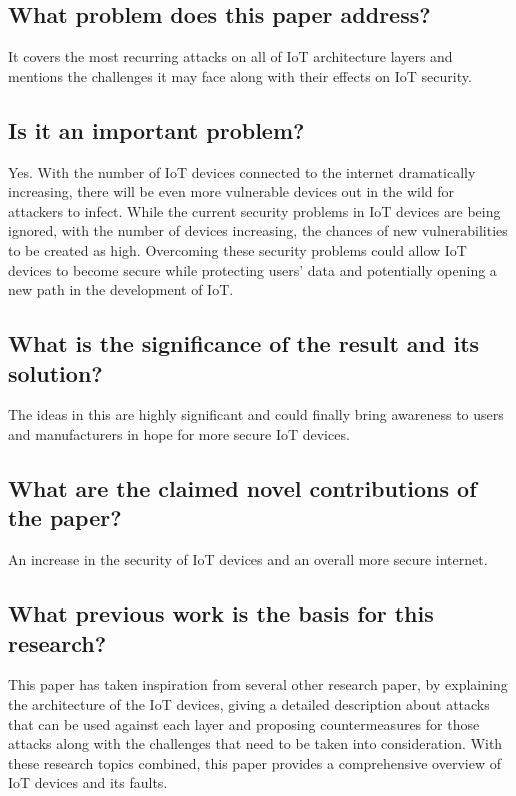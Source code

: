 \documentclass[11pt,a4paper]{article}
\begin{document}
\subsection*{What problem does this paper address?}
It covers the most recurring attacks on all of IoT architecture layers and mentions the challenges it may face along with their effects on IoT security. 

\subsection*{Is it an important problem?}
Yes. With the number of IoT devices connected to the internet dramatically increasing, there will be even more vulnerable devices out in the wild for attackers to infect. While the current security problems in IoT devices are being ignored, with the number of devices increasing, the chances of new vulnerabilities to be created as high. Overcoming these security problems could allow IoT devices to become secure while protecting users’ data and potentially opening a new path in the development of IoT. 

\subsection*{What is the significance of the result and its solution?}
The ideas in this are highly significant and could finally bring awareness to users and manufacturers in hope for more secure IoT devices. 

\subsection*{What are the claimed novel contributions of the paper?}
An increase in the security of IoT devices and an overall more secure internet. 

\subsection*{What previous work is the basis for this research?}
This paper has taken inspiration from several other research paper, by explaining the architecture of the IoT devices, giving a detailed description about attacks that can be used against each layer and proposing countermeasures for those attacks along with the challenges that need to be taken into consideration. With these research topics combined, this paper provides a comprehensive overview of IoT devices and its faults. 
\end{document}
